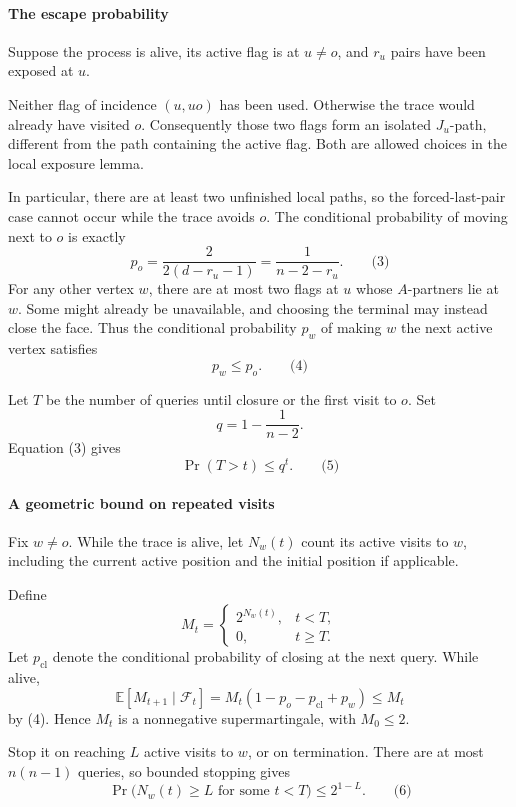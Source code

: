 \documentclass[
  11pt,
  a4paper,
]{article}
\begin{document}
\paragraph{The escape probability}\label{the-escape-probability}

Suppose the process is alive, its active flag is at \(u\ne o\), and
\(r_u\) pairs have been exposed at \(u\).

Neither flag of incidence \((u,uo)\) has been used. Otherwise the trace
would already have visited \(o\). Consequently those two flags form an
isolated \(J_u\)-path, different from the path containing the active
flag. Both are allowed choices in the local exposure lemma.

In particular, there are at least two unfinished local paths, so the
forced-last-pair case cannot occur while the trace avoids \(o\). The
conditional probability of moving next to \(o\) is exactly \[
p_o=\frac{2}{2(d-r_u-1)}
=\frac{1}{n-2-r_u}.
\qquad\text{(3)}
\] For any other vertex \(w\), there are at most two flags at \(u\)
whose \(A\)-partners lie at \(w\). Some might already be unavailable,
and choosing the terminal may instead close the face. Thus the
conditional probability \(p_w\) of making \(w\) the next active vertex
satisfies \[
p_w\le p_o.
\qquad\text{(4)}
\]

Let \(T\) be the number of queries until closure or the first visit to
\(o\). Set \[
q=1-\frac{1}{n-2}.
\] Equation (3) gives \[
\boxed{\Pr(T>t)\le q^t.}
\qquad\text{(5)}
\]

\paragraph{A geometric bound on repeated
visits}\label{a-geometric-bound-on-repeated-visits}

Fix \(w\ne o\). While the trace is alive, let \(N_w(t)\) count its
active visits to \(w\), including the current active position and the
initial position if applicable.

Define \[
M_t=
\begin{cases}
2^{N_w(t)},&t<T,\\
0,&t\ge T.
\end{cases}
\] Let \(p_{\mathrm{cl}}\) denote the conditional probability of closing
at the next query. While alive, \[
\mathbb E[M_{t+1}\mid\mathcal F_t]
=
M_t(1-p_o-p_{\mathrm{cl}}+p_w)
\le M_t
\] by (4). Hence \(M_t\) is a nonnegative supermartingale, with
\(M_0\le2\).

Stop it on reaching \(L\) active visits to \(w\), or on termination.
There are at most \(n(n-1)\) queries, so bounded stopping gives \[
\boxed{
\Pr\bigl(N_w(t)\ge L\text{ for some }t<T\bigr)
\le 2^{1-L}.
}
\qquad\text{(6)}
\]
\end{document}
